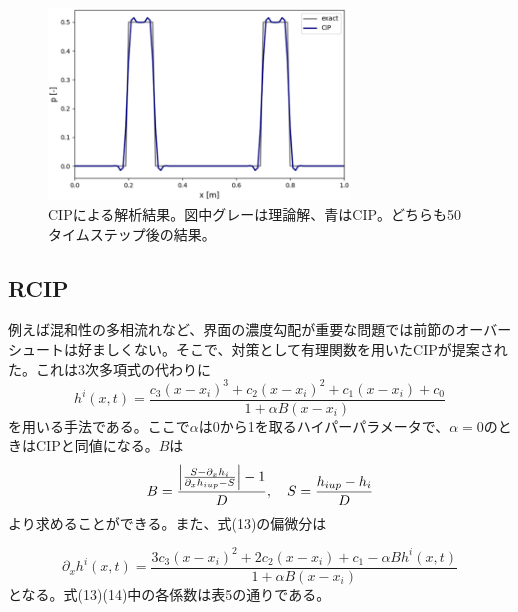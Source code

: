 \documentclass[dvipdfmx, 9pt, a4paper]{jsarticle}
\begin{document}
\begin{figure}[b]
\begin{center}
\includegraphics[width=8cm]{"fig6.png"}
\caption{CIPによる解析結果。図中グレーは理論解、青はCIP。どちらも50タイムステップ後の結果。}
\end{center}
\end{figure}

\subsection{RCIP}
例えば混和性の多相流れなど、界面の濃度勾配が重要な問題では前節のオーバーシュートは好ましくない。そこで、対策として有理関数を用いたCIPが提案された。これは3次多項式の代わりに
\begin{equation}
h^i(x, t)=\frac{c_3(x-x_i)^3+c_2(x-x_i)^2+c_1(x-x_i)+c_0}{1+\alpha B(x-x_i)}
\end{equation}
を用いる手法である。ここで$\alpha$は0から1を取るハイパーパラメータで、$\alpha=0$のときはCIPと同値になる。$B$は
\begin{equation}
B=\frac{\left| \frac{S-\partial_xh_i}{\partial_xh_{iup}-S} \right|-1}{D},~~~S=\frac{h_{iup}-h_i}{D} \notag
\end{equation}
より求めることができる。また、式(13)の偏微分は

\begin{equation}
\partial_xh^i(x, t)=\frac{3c_3(x-x_i)^2+2c_2(x-x_i)+c_1-\alpha B h^i(x, t)}{1+\alpha B(x-x_i)}
\end{equation}
となる。式(13)(14)中の各係数は表5の通りである。\par
\begin{table}[t]
\begin{center}
\caption{RCIPにおける係数(表中$h$は列毎に$f$もしくは$g$に置き換える)}
\end{center}
\end{table}
\end{document}
